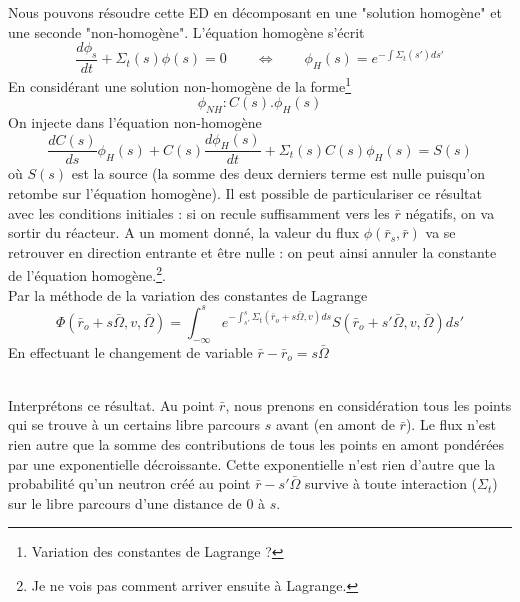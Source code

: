 Nous pouvons résoudre cette ED en décomposant en une "solution homogène" et une seconde "non-homogène". 
L'équation homogène s'écrit
\begin{equation}
\dfrac{d\phi_s}{dt}+\Sigma_t(s)\phi(s) = 0\qquad\Leftrightarrow\qquad\phi_H(s) = e^{-\int \Sigma_t(s')ds'}
\end{equation}
En considérant une solution non-homogène de la forme\footnote{Variation des constantes de Lagrange ?}
\begin{equation}
\phi_{NH} : C(s).\phi_H(s)
\end{equation}
On injecte dans l'équation non-homogène
\begin{equation}
\frac{dC(s)}{ds}\phi_H(s)+C(s)\frac{d\phi_H(s)}{dt} + \Sigma_t(s)C(s)\phi_H(s) = S(s)
\end{equation}
où $S(s)$ est la source (la somme des deux derniers terme est nulle puisqu'on retombe sur l'équation homogène). Il est possible de 
particulariser ce résultat avec les conditions initiales : si on recule suffisamment vers les 
$\bar r$ négatifs, on va sortir du réacteur. A un moment donné, la valeur du flux 
$\phi(\bar r_s, \bar r)$ va se retrouver en direction entrante et être nulle : on peut ainsi 
annuler la constante de l'équation homogène.\footnote{Je ne vois pas comment arriver ensuite à Lagrange.}. \\

Par la méthode de la variation des constantes de Lagrange
\begin{equation}
\varPhi ({\bar r_o} + s\bar \Omega ,v,\bar \Omega ) = \int_{ - \infty }^s {  {e^{ - \int_{s'}^s    {\Sigma _t}({{\bar r}_o} + s\bar \Omega ,v)ds}}} S({\bar r_o} + s'\bar \Omega ,v,\bar \Omega )ds'
\end{equation}
En effectuant le changement de variable $\bar r - {\bar r_o} = s\bar \Omega $

\ \\

Interprétons ce résultat. Au point $\bar r$, nous prenons en considération tous les points qui se 
trouve à un certains libre parcours $s$ avant (en amont de $\bar r$). Le flux n'est rien autre que la somme 
des contributions de tous les points en amont pondérées par une exponentielle décroissante. Cette exponentielle n'est 
rien d'autre que la probabilité qu'un neutron créé au point $\bar r - s'\bar \Omega$ survive à toute interaction ($\Sigma_t$)
sur le libre parcours d'une distance de 0 à $s$.\\

